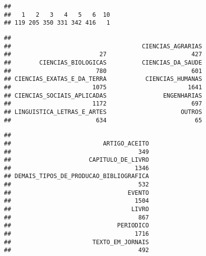 \documentclass[]{article}
\newenvironment{Shaded}{\begin{snugshade}}{\end{snugshade}}
\newcommand{\KeywordTok}[1]{\textcolor[rgb]{0.13,0.29,0.53}{\textbf{#1}}}
\newcommand{\CommentTok}[1]{\textcolor[rgb]{0.56,0.35,0.01}{\textit{#1}}}
\newcommand{\ControlFlowTok}[1]{\textcolor[rgb]{0.13,0.29,0.53}{\textbf{#1}}}
\newcommand{\OperatorTok}[1]{\textcolor[rgb]{0.81,0.36,0.00}{\textbf{#1}}}
\newcommand{\NormalTok}[1]{#1}
\begin{document}
\begin{verbatim}
## 
##   1   2   3   4   5   6  10 
## 119 205 350 331 342 416   1
\end{verbatim}

\begin{Shaded}
\end{Shaded}

\begin{verbatim}
## 
##                                     CIENCIAS_AGRARIAS 
##                         27                        427 
##        CIENCIAS_BIOLOGICAS          CIENCIAS_DA_SAUDE 
##                        780                        601 
## CIENCIAS_EXATAS_E_DA_TERRA           CIENCIAS_HUMANAS 
##                       1075                       1641 
## CIENCIAS_SOCIAIS_APLICADAS                ENGENHARIAS 
##                       1172                        697 
## LINGUISTICA_LETRAS_E_ARTES                     OUTROS 
##                        634                         65
\end{verbatim}

\begin{Shaded}
\end{Shaded}

\begin{verbatim}
## 
##                          ARTIGO_ACEITO 
##                                    349 
##                      CAPITULO_DE_LIVRO 
##                                   1346 
## DEMAIS_TIPOS_DE_PRODUCAO_BIBLIOGRAFICA 
##                                    532 
##                                 EVENTO 
##                                   1504 
##                                  LIVRO 
##                                    867 
##                              PERIODICO 
##                                   1716 
##                       TEXTO_EM_JORNAIS 
##                                    492
\end{verbatim}
\end{document}
